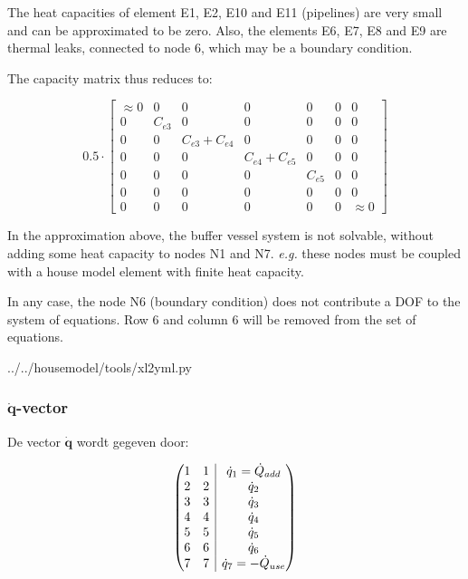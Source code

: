 The heat capacities of element E1, E2, E10 and E11 (pipelines) are very small and can be approximated to be zero. Also, the elements E6, E7, E8 and E9 are thermal leaks, connected to node 6, which may be a boundary condition.

The capacity matrix thus reduces to:

\[
0.5 \cdot 
\begin{bmatrix}
	\approx 0 & 0 & 0 & 0 & 0 & 0 & 0 \\
	0 & C_{e3} & 0 & 0 & 0 & 0 & 0 \\
	0 & 0 & C_{e3} + C_{e4} & 0 & 0 & 0 & 0 \\
	0 & 0 & 0 & C_{e4} + C_{e5} & 0 & 0 & 0 \\
	0 & 0 & 0 & 0 & C_{e5} & 0 & 0 \\
	0 & 0 & 0 & 0 & 0 & 0 & 0 \\
	0 & 0 & 0 & 0 & 0 & 0 & \approx 0
\end{bmatrix}
\]

In the approximation above, the buffer vessel system is not solvable, without adding some heat capacity to nodes N1 and N7. \emph{e.g.} these nodes must be coupled with a house model element with finite heat capacity.

In any case, the node N6 (boundary condition) does not contribute a DOF to the system of equations. Row 6 and column 6 will be removed from the set of equations.

 
{../../housemodel/tools/xl2yml.py}

\subsubsection{$\mathbf{\dot{q}}$-vector}

De vector $\mathbf{\dot{q}}$ wordt gegeven door:

\[
\left(\hspace{-5pt}\begin{array}{cc|c}
	1 & 1 & \dot{q}_1 = \dot{Q}_{add}\\
	2 & 2 & \dot{q}_2\\
	3 & 3 & \dot{q}_3\\
	4 & 4 & \dot{q}_4\\
	5 & 5 & \dot{q}_5\\
	6 & 6 & \dot{q}_6\\
	7 & 7 & \dot{q}_7 = -\dot{Q}_{use}
\end{array}\hspace{-5pt}\right)
\]

